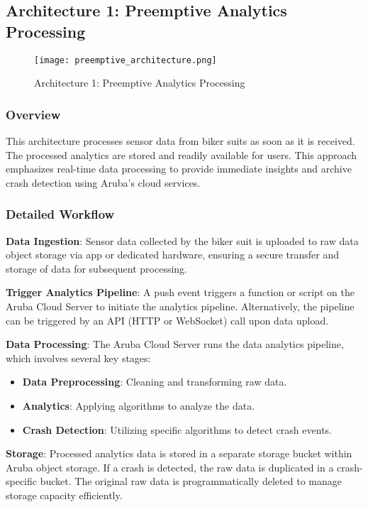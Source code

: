 \subsection{Architecture 1: Preemptive Analytics Processing}

\begin{figure}[htbp]
    \centering
    \texttt{[image: preemptive\_architecture.png]}
    \caption{Architecture 1: Preemptive Analytics Processing}
\end{figure}

\subsubsection{Overview}
This architecture processes sensor data from biker suits as soon as it is received. The processed analytics are stored and readily available for users. This approach emphasizes real-time data processing to provide immediate insights and archive crash detection using Aruba's cloud services.

\subsubsection{Detailed Workflow}

\textbf{Data Ingestion}:  
Sensor data collected by the biker suit is uploaded to raw data object storage via app or dedicated hardware, ensuring a secure transfer and storage of data for subsequent processing.

\textbf{Trigger Analytics Pipeline}:  
A push event triggers a function or script on the Aruba Cloud Server to initiate the analytics pipeline. Alternatively, the pipeline can be triggered by an API (HTTP or WebSocket) call upon data upload.

\textbf{Data Processing}:  
The Aruba Cloud Server runs the data analytics pipeline, which involves several key stages:
\begin{itemize}
    \item \textbf{Data Preprocessing}: Cleaning and transforming raw data.
    \item \textbf{Analytics}: Applying algorithms to analyze the data.
    \item \textbf{Crash Detection}: Utilizing specific algorithms to detect crash events.
\end{itemize}

\textbf{Storage}:  
Processed analytics data is stored in a separate storage bucket within Aruba object storage. If a crash is detected, the raw data is duplicated in a crash-specific bucket. The original raw data is programmatically deleted to manage storage capacity efficiently.

